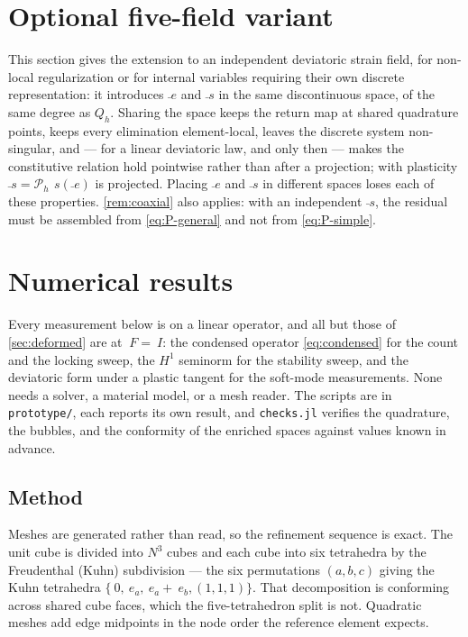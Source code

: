 \documentclass{article}
\newcommand{\F}{~F}
\newcommand{\Id}{~I}
\newcommand{\edev}{~e}
\newcommand{\sdev}{~s}
\newcommand{\code}[1]{\texttt{#1}}
\theoremstyle{definition}
\theoremstyle{plain}
\begin{document}
\section{Optional five-field variant}
\label{sec:fivefield}

This section gives the extension to an independent deviatoric strain field,
for non-local regularization or for internal variables requiring their own
discrete representation: it introduces
$\bar\edev$ and $\bar\sdev$ in the same discontinuous space, of the same
degree as $Q_h$. Sharing the space keeps the return map at shared
quadrature points, keeps every elimination element-local, leaves the discrete
system non-singular, and --- for a linear deviatoric law, and only then ---
makes the constitutive relation hold pointwise rather than after a projection;
with plasticity $\bar\sdev = \mathcal{P}_h\,\sdev(\bar\edev)$ is projected. Placing $\bar\edev$ and $\bar\sdev$ in different spaces loses
each of these properties. \cref{rem:coaxial} also applies: with an
independent $\bar\sdev$, the residual must be assembled from
\eqref{eq:P-general} and not from \eqref{eq:P-simple}.

\section{Numerical results}
\label{sec:results}

Every measurement below is on a linear operator, and all but those of
\cref{sec:deformed} are at $\F = \Id$: the condensed operator
\eqref{eq:condensed} for the count and the locking sweep, the $H^1$ seminorm
for the stability sweep, and the deviatoric form under a plastic tangent for
the soft-mode measurements. None needs a solver, a material model,
or a mesh reader. The scripts are in \code{prototype/}, each reports its own
result, and \code{checks.jl} verifies the quadrature, the bubbles, and the
conformity of the enriched spaces against values known in advance.

\subsection{Method}
\label{sec:method}

Meshes are generated rather than read, so the refinement sequence is exact.
The unit cube is divided into $N^3$ cubes and each cube into six tetrahedra by
the Freudenthal (Kuhn) subdivision --- the six permutations $(a,b,c)$ giving
the Kuhn tetrahedra $\{~0, ~e_a, ~e_a + ~e_b, (1,1,1)\}$. That decomposition
is conforming across shared cube faces, which the five-tetrahedron split is
not. Quadratic meshes add edge midpoints in the node
order the reference element expects.
\end{document}
